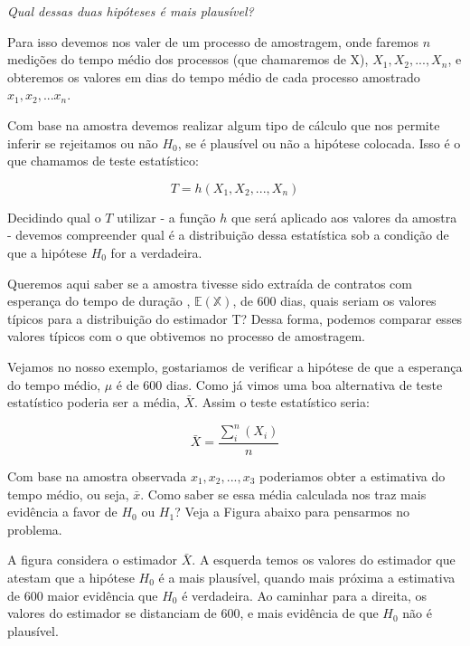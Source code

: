 \documentclass[
  letterpaper,
  DIV=11,
  numbers=noendperiod]{scrreprt}
\begin{document}
\emph{Qual dessas duas hipóteses é mais plausível?}

Para isso devemos nos valer de um processo de amostragem, onde faremos
\(n\) medições do tempo médio dos processos (que chamaremos de X),
\(X_1, X_2, ..., X_n\), e obteremos os valores em dias do tempo médio de
cada processo amostrado \(x_1, x_2,...x_n\).

Com base na amostra devemos realizar algum tipo de cálculo que nos
permite inferir se rejeitamos ou não \(H_0\), se é plausível ou não a
hipótese colocada. Isso é o que chamamos de teste estatístico:

\[T = h(X_1,X_2, . . .,X_n)\]

Decidindo qual o \(T\) utilizar - a função \(h\) que será aplicado aos
valores da amostra - devemos compreender qual é a distribuição dessa
estatística sob a condição de que a hipótese \(H_0\) for a verdadeira.

\begin{tcolorbox}[enhanced jigsaw, leftrule=.75mm, coltitle=black, colframe=quarto-callout-note-color-frame, toprule=.15mm, opacitybacktitle=0.6, bottomtitle=1mm, bottomrule=.15mm, titlerule=0mm, toptitle=1mm, title=\textcolor{quarto-callout-note-color}{\faInfo}\hspace{0.5em}{A Intuição}, arc=.35mm, breakable, opacityback=0, colbacktitle=quarto-callout-note-color!10!white, colback=white, left=2mm, rightrule=.15mm]

Queremos aqui saber se a amostra tivesse sido extraída de contratos com
esperança do tempo de duração , \(\mathbb{E(X)}\), de 600 dias, quais
seriam os valores típicos para a distribuição do estimador T? Dessa
forma, podemos comparar esses valores típicos com o que obtivemos no
processo de amostragem.

\end{tcolorbox}

Vejamos no nosso exemplo, gostariamos de verificar a hipótese de que a
esperança do tempo médio, \(\mu\) é de 600 dias. Como já vimos uma boa
alternativa de teste estatístico poderia ser a média, \(\bar{X}\). Assim
o teste estatístico seria:

\[\bar{X} = \frac{\sum_i^n(X_i)}{n}\]

Com base na amostra observada \(x_1, x_2, ..., x_3\) poderiamos obter a
estimativa do tempo médio, ou seja, \(\bar{x}\). Como saber se essa
média calculada nos traz mais evidência a favor de \(H_0\) ou \(H_1\)?
Veja a Figura abaixo para pensarmos no problema.

A figura considera o estimador \(\bar{X}\). A esquerda temos os valores
do estimador que atestam que a hipótese \(H_0\) é a mais plausível,
quando mais próxima a estimativa de 600 maior evidência que \(H_0\) é
verdadeira. Ao caminhar para a direita, os valores do estimador se
distanciam de 600, e mais evidência de que \(H_0\) não é plausível.
\end{document}
